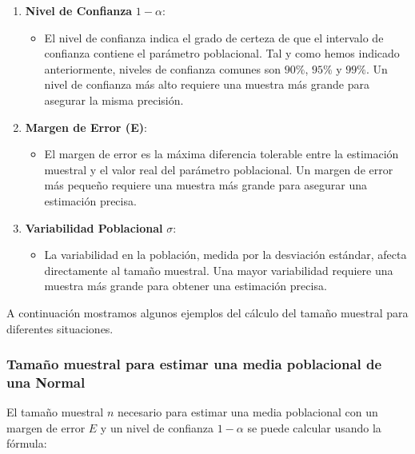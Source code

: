 \documentclass[
  letterpaper,
  DIV=11,
  numbers=noendperiod]{scrreprt}
\providecommand{\tightlist}{%
  \setlength{\itemsep}{0pt}\setlength{\parskip}{0pt}}\usepackage{longtable,booktabs,array}
\begin{document}
\begin{enumerate}
\def\labelenumi{\arabic{enumi}.}
\tightlist
\item
  \textbf{Nivel de Confianza} \(1-\alpha\):

  \begin{itemize}
  \tightlist
  \item
    El nivel de confianza indica el grado de certeza de que el intervalo
    de confianza contiene el parámetro poblacional. Tal y como hemos
    indicado anteriormente, niveles de confianza comunes son \(90\%\),
    \(95\%\) y \(99\%\). Un nivel de confianza más alto requiere una
    muestra más grande para asegurar la misma precisión.
  \end{itemize}
\item
  \textbf{Margen de Error (E)}:

  \begin{itemize}
  \tightlist
  \item
    El margen de error es la máxima diferencia tolerable entre la
    estimación muestral y el valor real del parámetro poblacional. Un
    margen de error más pequeño requiere una muestra más grande para
    asegurar una estimación precisa.
  \end{itemize}
\item
  \textbf{Variabilidad Poblacional} \(\sigma\):

  \begin{itemize}
  \tightlist
  \item
    La variabilidad en la población, medida por la desviación estándar,
    afecta directamente al tamaño muestral. Una mayor variabilidad
    requiere una muestra más grande para obtener una estimación precisa.
  \end{itemize}
\end{enumerate}

A continuación mostramos algunos ejemplos del cálculo del tamaño
muestral para diferentes situaciones.

\hypertarget{tamauxf1o-muestral-para-estimar-una-media-poblacional-de-una-normal}{%
\subsubsection{Tamaño muestral para estimar una media poblacional de una
Normal}\label{tamauxf1o-muestral-para-estimar-una-media-poblacional-de-una-normal}}

El tamaño muestral \(n\) necesario para estimar una media poblacional
con un margen de error \(E\) y un nivel de confianza \(1 - \alpha\) se
puede calcular usando la fórmula:
\end{document}
